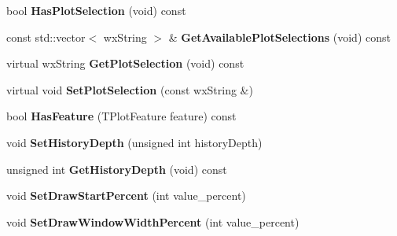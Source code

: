 \begin{DoxyCompactItemize}
\item 
\hypertarget{class_plot_canvas_image_analysis_af3157b911e775c08b94467a662efdea5}{bool {\bfseries Has\+Plot\+Selection} (void) const }\label{class_plot_canvas_image_analysis_af3157b911e775c08b94467a662efdea5}

\item 
\hypertarget{class_plot_canvas_image_analysis_a976fe218c7439a1581a0be8e63195ced}{const std\+::vector$<$ wx\+String $>$ \& {\bfseries Get\+Available\+Plot\+Selections} (void) const }\label{class_plot_canvas_image_analysis_a976fe218c7439a1581a0be8e63195ced}

\item 
\hypertarget{class_plot_canvas_image_analysis_a162bffd09dd5ff26dfb81b6b302b3c2a}{virtual wx\+String {\bfseries Get\+Plot\+Selection} (void) const }\label{class_plot_canvas_image_analysis_a162bffd09dd5ff26dfb81b6b302b3c2a}

\item 
\hypertarget{class_plot_canvas_image_analysis_aa99c214b5b6d9e1c6bd9f331d437f650}{virtual void {\bfseries Set\+Plot\+Selection} (const wx\+String \&)}\label{class_plot_canvas_image_analysis_aa99c214b5b6d9e1c6bd9f331d437f650}

\item 
\hypertarget{class_plot_canvas_image_analysis_a6ef3a4d2c4db0ddc367efab7d19536d9}{bool {\bfseries Has\+Feature} (T\+Plot\+Feature feature) const }\label{class_plot_canvas_image_analysis_a6ef3a4d2c4db0ddc367efab7d19536d9}

\item 
\hypertarget{class_plot_canvas_image_analysis_a75a0c328b42ddcb652904fcbc1bc13c0}{void {\bfseries Set\+History\+Depth} (unsigned int history\+Depth)}\label{class_plot_canvas_image_analysis_a75a0c328b42ddcb652904fcbc1bc13c0}

\item 
\hypertarget{class_plot_canvas_image_analysis_aa5a4b19504d792a84bc9eaa1069e35f6}{unsigned int {\bfseries Get\+History\+Depth} (void) const }\label{class_plot_canvas_image_analysis_aa5a4b19504d792a84bc9eaa1069e35f6}

\item 
\hypertarget{class_plot_canvas_image_analysis_ac3cd24f43c30c74e4092f73be7aeef8e}{void {\bfseries Set\+Draw\+Start\+Percent} (int value\+\_\+percent)}\label{class_plot_canvas_image_analysis_ac3cd24f43c30c74e4092f73be7aeef8e}

\item 
\hypertarget{class_plot_canvas_image_analysis_afb061eb3de76eb6e6fe832ff222668f2}{void {\bfseries Set\+Draw\+Window\+Width\+Percent} (int value\+\_\+percent)}\label{class_plot_canvas_image_analysis_afb061eb3de76eb6e6fe832ff222668f2}


\end{DoxyCompactItemize}
